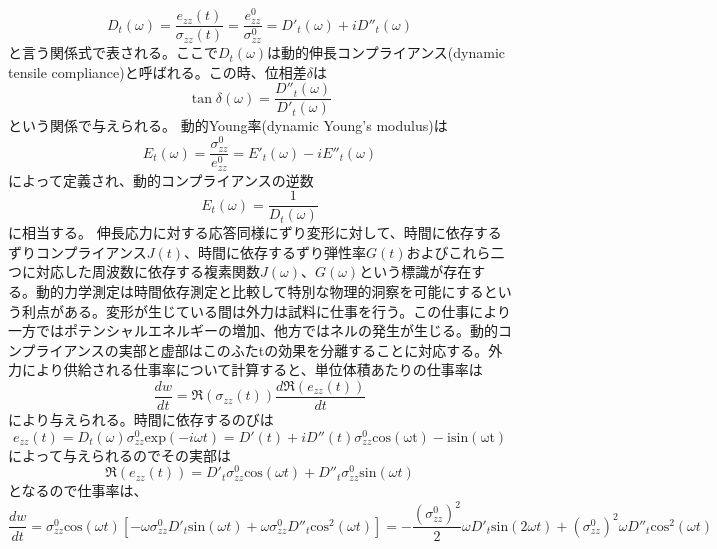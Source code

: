 \begin{equation}
    D_t(\omega) = \frac{e_{zz}(t)}{\sigma_{zz}(t)} = \frac{e_{zz}^0}{\sigma_{zz}^0}  = D'_t(\omega) + iD''_t(\omega)
\end{equation}
と言う関係式で表される。ここで$D_t(\omega)$は動的伸長コンプライアンス(dynamic tensile compliance)と呼ばれる。この時、位相差$\delta$は
\begin{equation}
    \tan\delta(\omega) = \frac{D''_t(\omega)}{D'_t(\omega)}
\end{equation}
という関係で与えられる。
動的Young率(dynamic Young's modulus)は
\begin{equation}
    E_t(\omega) = \frac{\sigma_{zz}^0}{e_{zz}^0}  = E'_t(\omega) - iE''_t(\omega)
\end{equation}
によって定義され、動的コンプライアンスの逆数
\begin{equation}
    E_t(\omega) = \frac{1}{D_t(\omega)}
\end{equation}
に相当する。
伸長応力に対する応答同様にずり変形に対して、時間に依存するずりコンプライアンス$J(t)$、時間に依存するずり弾性率$G(t)$およびこれら二つに対応した周波数に依存する複素関数$J(\omega)$、$G(\omega)$という標識が存在する。動的力学測定は時間依存測定と比較して特別な物理的洞察を可能にするという利点がある。変形が生じている間は外力は試料に仕事を行う。この仕事により一方ではポテンシャルエネルギーの増加、他方ではネルの発生が生じる。動的コンプライアンスの実部と虚部はこのふたtの効果を分離することに対応する。外力により供給される仕事率について計算すると、単位体積あたりの仕事率は
\begin{equation}
    \frac{dw}{dt}  = \mathfrak{R}(\sigma_{zz}(t))\frac{d\mathfrak{R}(e_{zz}(t))}{dt}
\end{equation}
により与えられる。時間に依存するのびは
\begin{equation}
    e_{zz}(t) =D_t(\omega)\sigma_{zz}^0\mathrm{exp}(-i \omega t ) = D'(t)+iD''(t)\sigma_{zz}^0\mathrm{cos(\omega t) - i\mathrm{sin}(\omega t)}
\end{equation}
によって与えられるのでその実部は
\begin{equation}
    \mathfrak{R}(e_{zz}(t)) = D'_t\sigma_{zz}^0\mathrm{cos}(\omega t) + D''_t\sigma_{zz}^0
\mathrm{sin}(\omega t)
\end{equation}
となるので仕事率は、
\begin{equation}
    \frac{dw}{dt} = \sigma_{zz}^0\mathrm{cos}(\omega t)[-\omega\sigma_{zz}^0D'_t\mathrm{sin}(\omega t) + \omega\sigma_{zz}^0D''_t\mathrm{cos}^2(\omega t)]
    = -\frac{(\sigma_{zz}^0)^2}{2}\omega D'_t\mathrm{sin}(2\omega t) + (\sigma_{zz}^0)^2\omega D''_t\mathrm{cos}^2(\omega t)
\end{equation}

